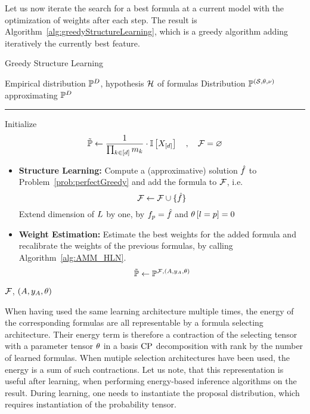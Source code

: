
Let us now iterate the search for a best formula at a current model with the optimization of weights after each step.
The result is Algorithm~\ref{alg:greedyStructureLearning}, which is a greedy algorithm adding iteratively the currently best feature.

\begin{algorithm}[hbt!]
    \caption{Greedy Structure Learning}\label{alg:greedyStructureLearning}
    \begin{algorithmic}
        \Require Empirical distribution $\mathbb{P}^{D}$, hypothesis $\mathcal{H}$ of formulas
        \Ensure Distribution $\mathbb{P}^{(\mathcal{S},\theta,\nu)}$ approximating $\mathbb{P}^{D}$
        \hrule
        \State Initialize
        \[ \tilde{\mathbb{P}} \leftarrow \frac{1}{\prod_{k\in[d]}m_{k}} \cdot \mathbb{I}\left[X_{[d]}\right] \quad, \quad \mathcal{F} = \varnothing \]
            \State
            \begin{itemize}
                \item \textbf{Structure Learning:} Compute a (approximative) solution $\hat{f}$ to Problem~\eqref{prob:perfectGreedy} and add the formula to $\mathcal{F}$, i.e.
                \[ \mathcal{F} \leftarrow \mathcal{F} \cup\{\hat{f}\} \]
                Extend dimension of $L$ by one, by $f_{p}=\hat{f}$ and $\theta\left[l=p\right]=0$
                \item \textbf{Weight Estimation:} Estimate the best weights for the added formula and recalibrate the weights of the previous formulas, by calling Algorithm~\ref{alg:AMM_HLN}.
                \[ \tilde{\mathbb{P}} \leftarrow \mathbb{P}^{\mathcal{F},(A,y_{A},\theta)} \]
            \end{itemize}
        \EndWhile
        \State \Return $\mathcal{F}$, $(A,y_{A},\theta)$ %
    \end{algorithmic}
\end{algorithm}


When having used the same learning architecture multiple times, the energy of the corresponding formulas are all representable by a formula selecting architecture.
Their energy term is therefore a contraction of the selecting tensor with a parameter tensor $\theta$ in a basis $\mathrm{CP}$ decomposition with rank by the number of learned formulas.
When mutiple selection architectures have been used, the energy is a sum of such contractions.
% 
Let us note, that this representation is useful after learning, when performing energy-based inference algorithms on the result.
During learning, one needs to instantiate the proposal distribution, which requires instantiation of the probability tensor.


